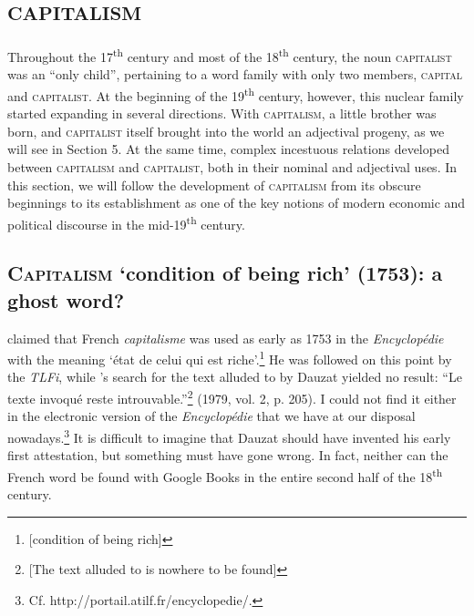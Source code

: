 \documentclass[output=paper]{langsci/langscibook}
\begin{document}
\section{\textsc{capitalism}}

Throughout the 17\textsuperscript{th} century and most of the
18\textsuperscript{th} century, the noun \textsc{capitalist} was an
``only child'', pertaining to a word family with only two members,
\textsc{capital} and \textsc{capitalist}. At the beginning of the
19\textsuperscript{th} century, however, this nuclear family started
expanding in several directions. With \textsc{capitalism}, a little
brother was born, and \textsc{capitalist} itself brought into the world
an adjectival progeny, as we will see in Section 5. At the same time,
complex incestuous relations developed between \textsc{capitalism} and
\textsc{capitalist}, both in their nominal and  adjectival uses. In
this section, we will follow the development of \textsc{capitalism} from
its obscure beginnings to its establishment as one of the key notions
of modern economic and political discourse in the mid-19\textsuperscript{th} century.

\subsection{\textsc{Capitalism} `condition of being rich' (1753): a ghost word?}

%
\citet{Dauzat72} %
%
claimed that French \emph{capitalisme} was used as early
as 1753 in the \emph{Encyclopédie} with the meaning `état de celui qui
est riche'.\footnote{{[}condition of being rich{]}} He was followed on
this point by the \emph{TLFi}, while %
\citeauthor{Braudel79}%
%
's search for the text
alluded to by Dauzat yielded no result: ``Le texte invoqué reste
introuvable.''\footnote{{[}The text alluded to is nowhere to be found{]}}
(1979, vol. 2, p. 205). I could not find it either in the electronic
version of the \emph{Encyclopédie} that we have at our disposal
nowadays.\footnote{Cf. http://portail.atilf.fr/encyclopedie/.} It is
difficult to imagine that Dauzat should have invented his early first
attestation, but something must have gone wrong. In fact, neither can the French word be found with Google Books in the entire second half of the  18\textsuperscript{th} century.
\end{document}
